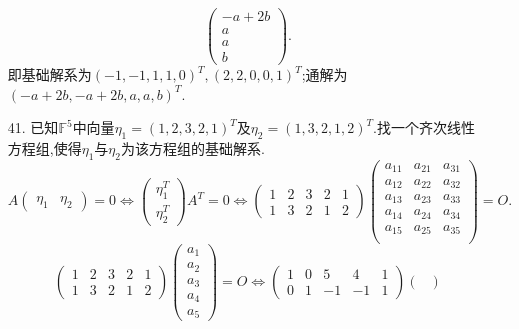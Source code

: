 \documentclass{article}
\begin{document}
\begin{enumerate}
\[\begin{pmatrix}
            -a+2b\\
            a\\
            a\\
            b
        \end{pmatrix}.
    \]
    即基础解系为${(-1,-1,1,1,0)}^T,{(2,2,0,0,1)}^T$;通解为${(-a+2b,-a+2b,a,a,b)}^T$.
    \item [41.]已知$\mathbb{F}^5$中向量$\eta _1={(1,2,3,2,1)}^T$及$\eta _2={(1,3,2,1,2)}^T$.找一个齐次线性方程组,使得$\eta_1$与$\eta_2$为该方程组的基础解系.
    \[
        A
        \begin{pmatrix}
            \eta_1 & \eta_2
        \end{pmatrix}=0
        \Leftrightarrow
        \begin{pmatrix}
            \eta_1 ^T\\
            \eta_2 ^T
        \end{pmatrix}
        A^T=0
        \Leftrightarrow
        \begin{pmatrix}
            1 & 2 & 3 & 2 & 1\\
            1 & 3 & 2 & 1 & 2
        \end{pmatrix}
        \begin{pmatrix}
            a_{11} & a_{21} & a_{31}\\
            a_{12} & a_{22} & a_{32}\\
            a_{13} & a_{23} & a_{33}\\
            a_{14} & a_{24} & a_{34}\\
            a_{15} & a_{25} & a_{35}\\
        \end{pmatrix}
        =O.
    \]
    \[
        \begin{pmatrix}
            1 & 2 & 3 & 2 & 1\\
            1 & 3 & 2 & 1 & 2
        \end{pmatrix}
        \begin{pmatrix}
            a_1\\ a_2\\ a_3\\ a_4\\ a_5
        \end{pmatrix}=O
        \Leftrightarrow
        \begin{pmatrix}
            1 & 0 & 5 & 4 & 1\\
            0 & 1 &-1 &-1 & 1
        \end{pmatrix}
        \begin{pmatrix}

\end{pmatrix}\]
\end{enumerate}
\end{document}
